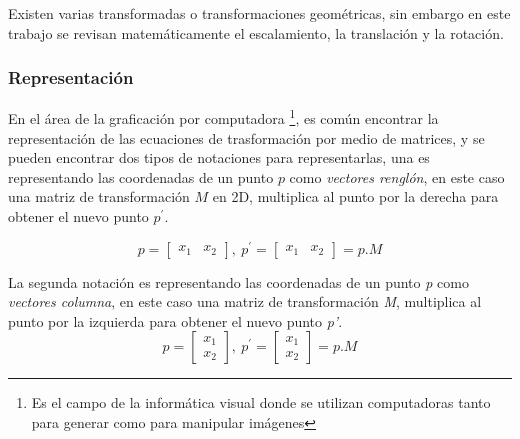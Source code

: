  \citep{villamarin2015}

Existen varias transformadas o transformaciones geométricas, sin embargo en este trabajo se revisan matemáticamente el escalamiento, la translación y la rotación.

\subsubsection{Representación}

En el área de la graficación por computadora \footnote{Es el campo de la informática visual donde se utilizan computadoras tanto para generar como para manipular imágenes}, es común encontrar la representación de las ecuaciones de trasformación por medio de matrices, y se pueden encontrar dos tipos de notaciones para representarlas, una es representando las coordenadas de un punto $p$ como \textit{vectores renglón}, en este caso una matriz de transformación $M$ en 2D, multiplica al punto por la derecha para obtener el nuevo punto $p^\prime$. \citep{Matias2007}

\begin{equation}
   p = \begin{bmatrix}
       x_{1} & x_{2}         
     \end{bmatrix}, \ p^{\prime} = \begin{bmatrix}
       x_{1} & x_{2}         
     \end{bmatrix}= p.M  
\end{equation} 
     
La segunda notación es representando las coordenadas de un punto \textit{p} como \textit{vectores columna}, en este caso una matriz de transformación \textit{M}, multiplica al punto por la izquierda para obtener el nuevo punto \textit{p'}.
\begin{equation}
     p = \begin{bmatrix}
       x_{1} \\ x_{2}         
     \end{bmatrix}, \ p^{\prime} = \begin{bmatrix}
       x_{1} \\ x_{2}           
     \end{bmatrix}= p.M 
\end{equation}
     
